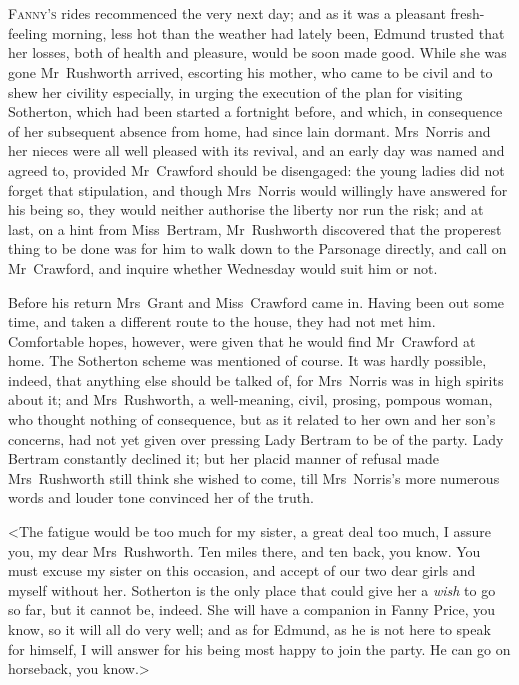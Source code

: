\chapter[Chapter \thechapter]{} 

 \lettrine[lraise=0.3]{F}{anny's} rides recommenced the very next day; and as it was a pleasant fresh-feeling morning, less hot than the weather had lately been, Edmund trusted that her losses, both of health and pleasure, would be soon made good. While she was gone Mr~Rushworth arrived, escorting his mother, who came to be civil and to shew her civility especially, in urging the execution of the plan for visiting Sotherton, which had been started a fortnight before, and which, in consequence of her subsequent absence from home, had since lain dormant. Mrs~Norris and her nieces were all well pleased with its revival, and an early day was named and agreed to, provided Mr~Crawford should be disengaged: the young ladies did not forget that stipulation, and though Mrs~Norris would willingly have answered for his being so, they would neither authorise the liberty nor run the risk; and at last, on a hint from Miss~Bertram, Mr~Rushworth discovered that the properest thing to be done was for him to walk down to the Parsonage directly, and call on Mr~Crawford, and inquire whether Wednesday would suit him or not.

Before his return Mrs~Grant and Miss~Crawford came in. Having been out some time, and taken a different route to the house, they had not met him. Comfortable hopes, however, were given that he would find Mr~Crawford at home. The Sotherton scheme was mentioned of course. It was hardly possible, indeed, that anything else should be talked of, for Mrs~Norris was in high spirits about it; and Mrs~Rushworth, a well-meaning, civil, prosing, pompous woman, who thought nothing of consequence, but as it related to her own and her son's concerns, had not yet given over pressing Lady Bertram to be of the party. Lady Bertram constantly declined it; but her placid manner of refusal made Mrs~Rushworth still think she wished to come, till Mrs~Norris's more numerous words and louder tone convinced her of the truth.

<The fatigue would be too much for my sister, a great deal too much, I assure you, my dear Mrs~Rushworth. Ten miles there, and ten back, you know. You must excuse my sister on this occasion, and accept of our two dear girls and myself without her. Sotherton is the only place that could give her a \textit{wish}  to go so far, but it cannot be, indeed. She will have a companion in Fanny Price, you know, so it will all do very well; and as for Edmund, as he is not here to speak for himself, I will answer for his being most happy to join the party. He can go on horseback, you know.>

